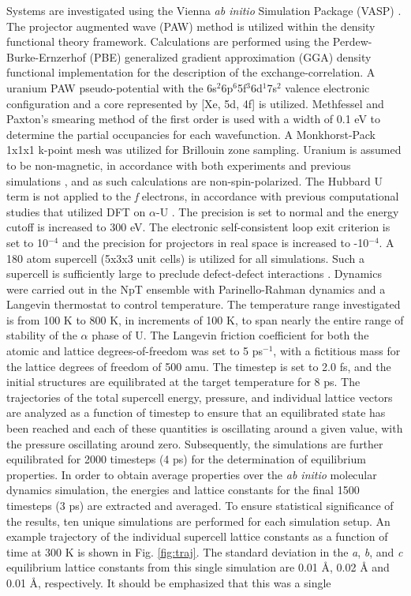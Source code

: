 \documentclass[utf8]{frontiersSCNS} %
\begin{document}
Systems are investigated using the Vienna \textit{ab initio} Simulation Package (VASP) \cite{vasp1, vasp2, vasp3, vasp4}. The projector augmented wave (PAW) method \cite{paw1, paw2} is utilized within the density functional theory \cite{dft1, dft2} framework. Calculations are performed using the Perdew-Burke-Ernzerhof (PBE) \cite{pbe1, pbe2} generalized gradient approximation (GGA) density functional implementation for the description of the exchange-correlation. A uranium PAW pseudo-potential with the 6s$^{2}$6p$^{6}$5f$^{3}$6d$^{1}$7s$^{2}$ valence electronic configuration and a core represented by [Xe, 5d, 4f] is utilized. Methfessel and Paxton's smearing method \cite{methfessel} of the first order is used with a width of 0.1 eV to determine the partial occupancies for each wavefunction. A Monkhorst-Pack \cite{monkhorst} 1x1x1 k-point mesh was utilized for Brillouin zone sampling. Uranium is assumed to be non-magnetic, in accordance with both experiments \cite{chembook} and previous simulations \cite{beeler2013}, and as such calculations are non-spin-polarized. The Hubbard U term is not applied to the \textit{f} electrons, in accordance with previous computational studies that utilized DFT on $\alpha$-U \cite{wirth2011, wirth2012, taylor2008, beeler2013}. The precision is set to normal and the energy cutoff is increased to 300 eV. The electronic self-consistent loop exit criterion is set to 10$^{-4}$ and the precision for projectors in real space is increased to -10$^{-4}$. A 180 atom supercell (5x3x3 unit cells) is utilized for all simulations. Such a supercell is sufficiently large to preclude defect-defect interactions \cite{wirth2011}. Dynamics were carried out in the NpT ensemble with Parinello-Rahman dynamics and a Langevin thermostat to control temperature. The temperature range investigated is from 100 K to 800 K, in increments of 100 K, to span nearly the entire range of stability of the $\alpha$ phase of U. The Langevin friction coefficient for both the atomic and lattice degrees-of-freedom was set to 5 ps$^{-1}$, with a fictitious mass for the lattice degrees of freedom of 500 amu. The timestep is set to 2.0 fs, and the initial structures are equilibrated at the target temperature for 8 ps. The trajectories of the total supercell energy, pressure, and individual lattice vectors are analyzed as a function of timestep to ensure that an equilibrated state has been reached and each of these quantities is oscillating around a given value, with the pressure oscillating around zero. Subsequently, the simulations are further equilibrated for 2000 timesteps (4 ps) for the determination of equilibrium properties. In order to obtain average properties over the \textit{ab initio} molecular dynamics simulation, the energies and lattice constants for the final 1500 timesteps (3 ps) are extracted and averaged. To ensure statistical significance of the results, ten unique simulations are performed for each simulation setup. An example trajectory of the individual supercell lattice constants as a function of time at 300 K is shown in Fig. \ref{fig:traj}. The standard deviation in the \textit{a}, \textit{b}, and \textit{c} equilibrium lattice constants from this single simulation are 0.01 \AA, 0.02 {\AA} and 0.01 \AA, respectively. It should be emphasized that this was a single 
\end{document}
